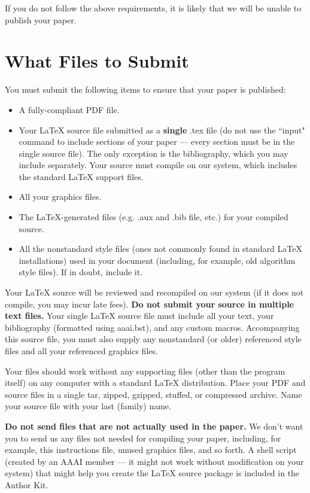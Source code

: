 \documentclass[letterpaper]{article}
\begin{document}
If you do not follow the above requirements, it is likely that we will be unable to publish your paper.

\section{What Files to Submit}
You must submit the following items to ensure that your paper is published:
\begin{itemize}
\item A fully-compliant PDF file.
\item Your  \LaTeX{}  source file submitted as a \textbf{single} .tex file (do not use the ``input" command to include sections of your paper --- every section must be in the single source file). The only exception is the bibliography, which you may include separately. Your source must compile on our system, which includes the standard \LaTeX{} support files.
\item All your graphics files.
\item The \LaTeX{}-generated files (e.g. .aux and .bib file, etc.) for your compiled source.
\item All the nonstandard style files (ones not commonly found in standard \LaTeX{} installations) used in your document (including, for example, old algorithm style files). If in doubt, include it.
\end{itemize}

Your \LaTeX{} source will be reviewed and recompiled on our system (if it does not compile, you may incur late fees).   \textbf{Do not submit your source in multiple text files.} Your single \LaTeX{} source file must include all your text, your bibliography (formatted using aaai.bst), and any custom macros. Accompanying this source file, you must also supply any nonstandard (or older) referenced style files and all your referenced graphics files. 

Your files should work without any supporting files (other than the program itself) on any computer with a standard \LaTeX{} distribution. Place your PDF and source files in a single tar, zipped, gzipped, stuffed, or compressed archive. Name your source file with your last (family) name.

\textbf{Do not send files that are not actually used in the paper.} We don't want you to send us any files not needed for compiling your paper, including, for example, this instructions file, unused graphics files, and so forth.  A shell script (created by an AAAI member --- it might not work without modification on your system) that might help you create the \LaTeX{} source package is included in the Author Kit.
\end{document}
